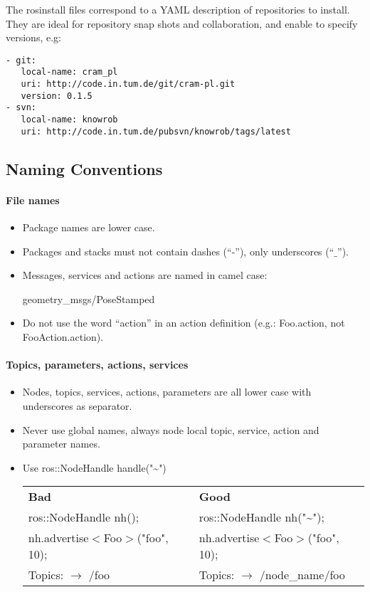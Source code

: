 The rosinstall files correspond to a YAML description of repositories to install.
They are ideal for repository snap shots and collaboration, and enable to specify versions, e.g:
\begin{verbatim}
- git:
   local-name: cram_pl
   uri: http://code.in.tum.de/git/cram-pl.git
   version: 0.1.5
- svn:
   local-name: knowrob
   uri: http://code.in.tum.de/pubsvn/knowrob/tags/latest
\end{verbatim}


\subsection{Naming Conventions}
\paragraph{File names}
\begin{itemize}
\item Package names are lower case.
\item Packages and stacks must not contain dashes (“-”), only underscores (“$\_$”).
\item Messages, services and actions are named in camel case:
\begin{tt}geometry\_msgs/PoseStamped \end{tt}
\item Do not use the word “action” in an action definition (e.g.: Foo.action, not FooAction.action).
\end{itemize}

\paragraph{Topics, parameters, actions, services}
\begin{itemize}[noitemsep]
\item Nodes, topics, services, actions, parameters are all lower case with underscores as separator.
\item Never use global names, always node local topic, service, action and parameter names. 
\item Use ros::NodeHandle handle("\textasciitilde")\\
\begin{tabular}{ll}
\textbf{Bad} & \textbf{Good}\\
ros::NodeHandle nh();         & ros::NodeHandle nh("\textasciitilde");\\
nh.advertise$<$Foo$>$("foo", 10); & nh.advertise$<$Foo$>$("foo", 10);\\
Topics: $\rightarrow$ /foo &
Topics: $\rightarrow$ /node\_name/foo
\end{tabular}
\end{itemize}


